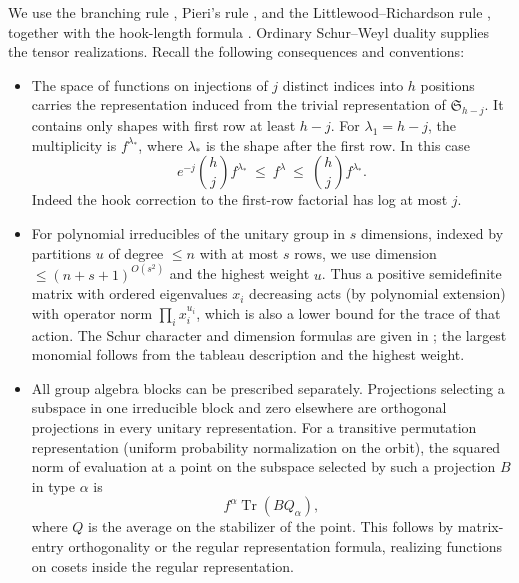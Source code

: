 We use the branching rule \cite[Theorem~2.8.3]{Sagan2001}, Pieri's rule \cite[Theorem~7.15.7]{Stanley1999}, and the Littlewood--Richardson rule \cite[Theorem~16.4]{James1978}, together with the hook-length formula \cite[Theorem~3.10.2]{Sagan2001}. Ordinary Schur--Weyl duality \cite[Theorem~4.57 and Corollary~4.59]{etingof} supplies the tensor realizations. Recall the following consequences and conventions:
\begin{itemize}
\item The space of functions on injections of \(j\) distinct indices into \(h\) positions carries the representation induced from the trivial representation of \(\mathfrak S_{h-j}\). It contains only shapes with first row at least \(h-j\). For \(\lambda_1=h-j\), the multiplicity is \(f^{\lambda_*}\), where \(\lambda_*\) is the shape after the first row. In this case
\begin{equation}
 e^{-j}\binom hj f^{\lambda_*}\ \le\ f^\lambda\ \le\ \binom hj f^{\lambda_*}.
 \label{ten:frames:eq:2}
\end{equation}
Indeed the hook correction to the first-row factorial has log at most \(j\).
\item For polynomial irreducibles of the unitary group in \(s\) dimensions, indexed by partitions \(u\) of degree \(\le n\) with at most \(s\) rows, we use dimension \(\le (n+s+1)^{O(s^2)}\) and the highest weight \(u\). Thus a positive semidefinite matrix with ordered eigenvalues \(x_i\) decreasing acts (by polynomial extension) with operator norm \(\prod_i x_i^{u_i}\), which is also a lower bound for the trace of that action. The Schur character and dimension formulas are given in \citet[Theorem~4.63]{etingof}; the largest monomial follows from the tableau description and the highest weight.
\item All group algebra blocks can be prescribed separately. Projections selecting a subspace in one irreducible block and zero elsewhere are orthogonal projections in every unitary representation. For a transitive permutation representation (uniform probability normalization on the orbit), the squared norm of evaluation at a point on the subspace selected by such a projection \(B\) in type \(\alpha\) is
\[
 f^\alpha \operatorname{Tr}(B Q_\alpha),
\]
where \(Q\) is the average on the stabilizer of the point. This follows by matrix-entry orthogonality or the regular representation formula, realizing functions on cosets inside the regular representation.
\end{itemize}

